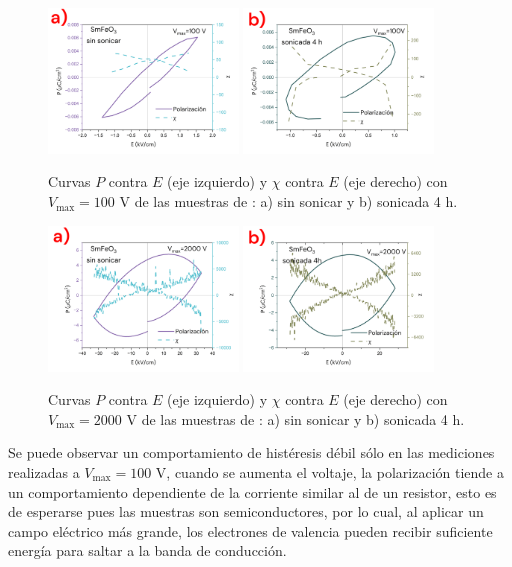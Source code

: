 \documentclass[../main.tex]{subfiles}
\begin{document}
\begin{figure}[H]
    \centering
    \includegraphics[width=0.45\textwidth]{fig/PESmFeO3100V.png}
    \quad
    \includegraphics[width=0.45\textwidth]{fig/PESmFeO3-S100V.png}
    \caption{Curvas $P$ contra $E$ (eje izquierdo) y $\chi$ contra $E$ (eje derecho) con $V_\text{max}=100$ V de las muestras de \sama{}: a) sin sonicar y b) sonicada 4 h.}
    \label{fig:sm100v}
\end{figure}
\begin{figure}[H]
    \centering
    \includegraphics[width=0.45\textwidth]{fig/PESmFeO32000V.png}
    \quad
    \includegraphics[width=0.45\textwidth]{fig/PESmFeO3-S2000V.png}
    \caption{Curvas $P$ contra $E$ (eje izquierdo) y $\chi$ contra $E$ (eje derecho) con $V_\text{max}=2000$ V de las muestras de \sama{}: a) sin sonicar y b) sonicada 4 h.}
    \label{fig:sm2000v}
\end{figure}
Se puede observar un comportamiento de histéresis débil sólo en las mediciones realizadas a $V_\text{max}=100$ V, cuando se aumenta el voltaje, la polarización tiende a un comportamiento dependiente de la corriente similar al de un resistor, esto es de esperarse pues las muestras son semiconductores, por lo cual, al aplicar un campo eléctrico más grande, los electrones de valencia pueden recibir suficiente energía para saltar a la banda de conducción.
\end{document}
